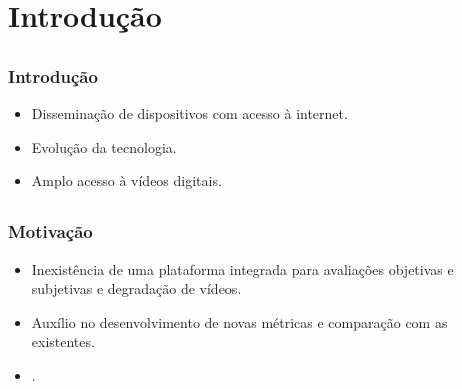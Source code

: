 \section{Introdução}


\subsection{}
    \begin{frame}\frametitle{Introdução}
        \begin{itemize}
            \item Disseminação de dispositivos com acesso à internet. %
            \item Evolução da tecnologia. %
            \item Amplo acesso à vídeos digitais. %
        \end{itemize}
    \end{frame}

\subsection{}
    \begin{frame}\frametitle{Motivação}
        \begin{itemize}
            \item Inexistência de uma plataforma integrada para avaliações objetivas e subjetivas e degradação de vídeos.
            \item Auxílio no desenvolvimento de novas métricas e comparação com as existentes.
            \item .
        \end{itemize}
    \end{frame}

